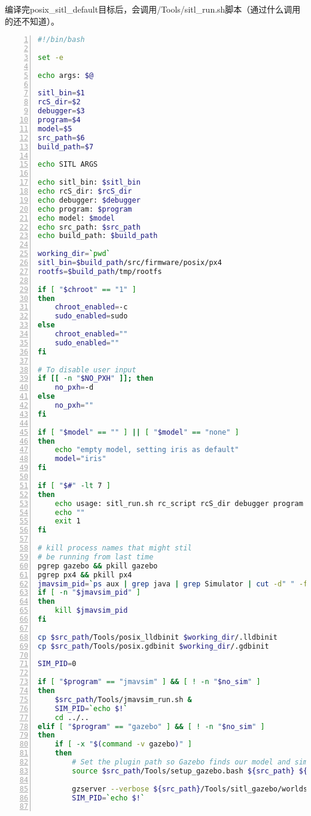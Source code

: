 编译完posix_sitl_default目标后，会调用/Tools/sitl_run.sh脚本（通过什么调用的还不知道）。
\begin{lstlisting}[language=bash,numbers=left,firstnumber = 1,breaklines = true,numberstyle=\tiny,keywordstyle=\color{blue!70},commentstyle=\color{red!50!green!50!blue!50},frame=shadowbox, rulesepcolor=\color{red!20!green!20!blue!20}]
#!/bin/bash

set -e

echo args: $@

sitl_bin=$1
rcS_dir=$2
debugger=$3
program=$4
model=$5
src_path=$6
build_path=$7

echo SITL ARGS

echo sitl_bin: $sitl_bin
echo rcS_dir: $rcS_dir
echo debugger: $debugger
echo program: $program
echo model: $model
echo src_path: $src_path
echo build_path: $build_path

working_dir=`pwd`
sitl_bin=$build_path/src/firmware/posix/px4
rootfs=$build_path/tmp/rootfs

if [ "$chroot" == "1" ]
then
	chroot_enabled=-c
	sudo_enabled=sudo
else
	chroot_enabled=""
	sudo_enabled=""
fi

# To disable user input
if [[ -n "$NO_PXH" ]]; then
	no_pxh=-d
else
	no_pxh=""
fi

if [ "$model" == "" ] || [ "$model" == "none" ]
then
	echo "empty model, setting iris as default"
	model="iris"
fi

if [ "$#" -lt 7 ]
then
	echo usage: sitl_run.sh rc_script rcS_dir debugger program model src_path build_path
	echo ""
	exit 1
fi

# kill process names that might stil
# be running from last time
pgrep gazebo && pkill gazebo
pgrep px4 && pkill px4
jmavsim_pid=`ps aux | grep java | grep Simulator | cut -d" " -f1`
if [ -n "$jmavsim_pid" ]
then
	kill $jmavsim_pid
fi

cp $src_path/Tools/posix_lldbinit $working_dir/.lldbinit
cp $src_path/Tools/posix.gdbinit $working_dir/.gdbinit

SIM_PID=0

if [ "$program" == "jmavsim" ] && [ ! -n "$no_sim" ]
then
	$src_path/Tools/jmavsim_run.sh &
	SIM_PID=`echo $!`
	cd ../..
elif [ "$program" == "gazebo" ] && [ ! -n "$no_sim" ]
then
	if [ -x "$(command -v gazebo)" ]
	then
		# Set the plugin path so Gazebo finds our model and sim
		source $src_path/Tools/setup_gazebo.bash ${src_path} ${build_path}

		gzserver --verbose ${src_path}/Tools/sitl_gazebo/worlds/${model}.world &
		SIM_PID=`echo $!`


\end{lstlisting}

